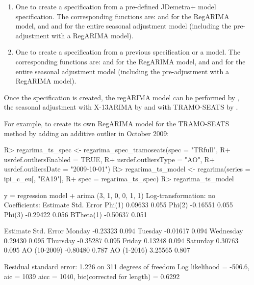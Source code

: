 \documentclass[article]{jss}
\begin{document}
\begin{enumerate}
\def\labelenumi{\arabic{enumi}.}
\item
  One to create a specification from a pre-defined JDemetra+ model
  specification. The corresponding functions are:
   and  for
  the RegARIMA model, and  and 
  for the entire seasonal adjustment model (including the pre-adjustment
  with a RegARIMA model).
\item
  One to create a specification from a previous specification or a
  model. The corresponding functions are:  and
   for the RegARIMA model, and
   and  for the entire seasonal
  adjustment model (including the pre-adjustment with a RegARIMA model).
\end{enumerate}

Once the specification is created, the regARIMA model can be performed
by , the seasonal adjustment with X-13ARIMA by
 and with TRAMO-SEATS by .

For example, to create its own RegARIMA model for the TRAMO-SEATS method
by adding an additive outlier in October 2009:

\begin{CodeChunk}

\begin{CodeInput}
R> regarima_ts_spec <- regarima_spec_tramoseats(spec = "TRfull",
R+              usrdef.outliersEnabled = TRUE,
R+              usrdef.outliersType = "AO",
R+              usrdef.outliersDate = "2009-10-01")
R> regarima_ts_model <- regarima(series = ipi_c_eu[, "EA19"],
R+                               spec = regarima_ts_spec)
R> regarima_ts_model
\end{CodeInput}

\begin{CodeOutput}
y = regression model + arima (3, 1, 0, 0, 1, 1)
Log-transformation: no
Coefficients:
          Estimate Std. Error
Phi(1)     0.09633      0.055
Phi(2)    -0.16551      0.055
Phi(3)    -0.29422      0.056
BTheta(1) -0.50637      0.051

             Estimate Std. Error
Monday       -0.23323      0.094
Tuesday      -0.01617      0.094
Wednesday     0.29430      0.095
Thursday     -0.35287      0.095
Friday        0.13248      0.094
Saturday      0.30763      0.095
AO (10-2009) -0.80480      0.787
AO (1-2016)   3.25565      0.807


Residual standard error: 1.226 on 311 degrees of freedom
Log likelihood = -506.6, aic =  1039 aicc =  1040, bic(corrected for length) = 0.6292
\end{CodeOutput}
\end{CodeChunk}
\end{document}
